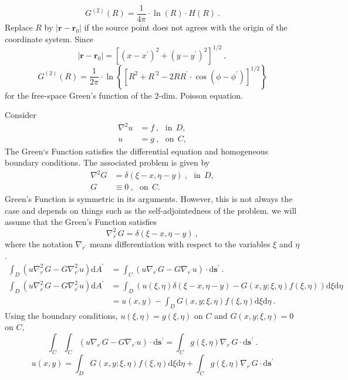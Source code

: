 \documentclass[11pt,a4paper]{article}
\renewcommand{\vec}[1]{\boldsymbol{#1}}
\newcommand{\dif}{\mathrm{d}}
\begin{document}
\begin{equation}
G^{(2)}(R) =  \dfrac{1}{4\pi} \cdot \ln (R) \cdot H(R) ~.
\end{equation}
Replace $R$ by $|\vec{r} - \vec{r}_0|$ if the source point does not agrees with the origin of the coordinate system. Since
\begin{equation}
|\vec{r} - \vec{r}_0| = [(x-x^\prime)^2 +(y-y^\prime)^2]^{1/2} ~,
\end{equation}
\begin{equation}
G^{(2)}(R) =  \dfrac{1}{2\pi} \cdot \ln \left\{[R^2 +R^{\prime 2} -2R R^\prime\cdot \cos (\phi -\phi^\prime)]^{1/2} \right\}
\end{equation}
for the free-space Green's function of the $2$-dim. Poisson equation.




\cite{Herman:1742872} Consider 
\begin{align}
\nabla^2 u &= f ~, ~~~ \text{in} ~~ D, \\
u &= g ~, ~~~ \text{on} ~~ C, 
\end{align}
The Green‘s Function satisfies the differential equation and homogeneous boundary conditions. The associated problem is given by
\begin{align}
\nabla^2 G &= \delta(\xi -x, \eta -y) ~, ~~~ \text{in} ~~ D, \\
G &\equiv 0 ~, ~~~ \text{on} ~~ C. 
\end{align}
Green's Function is symmetric in its arguments. However, this is not always the case and depends on things such as the self-adjointedness of the problem. we will assume that the Green's Function satisfies
\begin{equation}
\nabla_{r^\prime}^2 G = \delta(\xi -x, \eta -y) ~,
\end{equation}
where the notation $\nabla_{r^\prime}$ means differentiation with respect to the variables $\xi$ and $\eta$.
\begin{align}
\nonumber \int_D (u \nabla_{r^\prime}^2 G - G \nabla_{r^\prime}^2 u) \dif A^\prime &= \int_C (u \nabla_{r^\prime} G - G \nabla_{r^\prime} u) \cdot \dif \vec{s}^\prime ~. \\
\nonumber \int_D (u \nabla_{r^\prime}^2 G - G \nabla_{r^\prime}^2 u) \dif A^\prime &= \int_D(u(\xi, \eta) \delta(\xi-x, \eta- y) - G(x,y;\xi,\eta)f(\xi, \eta) ) \dif \xi \dif \eta \\
\nonumber &= u(x,y) - \int_D G(x,y;\xi,\eta)f(\xi, \eta) \dif \xi \dif \eta ~.
\end{align}
Using the boundary conditions, $u(\xi, \eta) = g(\xi, \eta)$ on $C$ and $G(x, y; \xi, \eta) = 0$ on $C$, 
\begin{equation}
\int_C \int_C (u \nabla_{r^\prime} G - G \nabla_{r^\prime} u) \cdot \dif \vec{s}^\prime = \int_C g(\xi, \eta) \nabla_{r^\prime} G \cdot \dif \vec{s}^\prime ~.
\end{equation}
\begin{equation}
u(x,y) = \int_D G(x,y;\xi,\eta)f(\xi, \eta) \dif \xi \dif \eta + \int_C g(\xi, \eta) \nabla_{r^\prime} G \cdot \dif \vec{s}^\prime
\end{equation}
\end{document}
